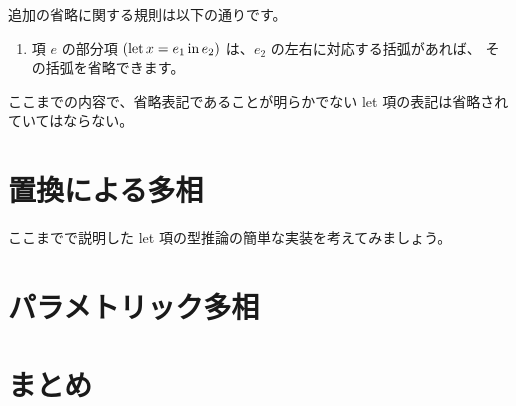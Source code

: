 追加の省略に関する規則は以下の通りです。

\begin{enumerate}
  \item 項 $e$ の部分項 $(\mathrm{let} \, x = e_1 \, \mathrm{in} \, e_2)$ は、$e_2$ の左右に対応する括弧があれば、
        その括弧を省略できます。
\end{enumerate}

\begin{note}
ここまでの内容で、省略表記であることが明らかでない let 項の表記は省略されていてはならない。
\end{note}

\section{置換による多相}

ここまでで説明した let 項の型推論の簡単な実装を考えてみましょう。



\section{パラメトリック多相}



\section{まとめ}



